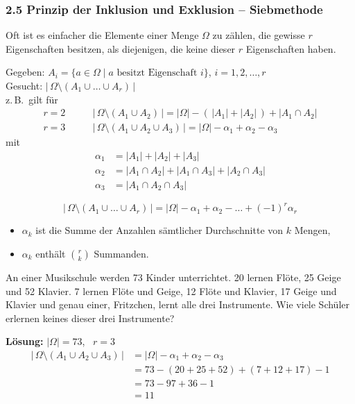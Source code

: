 \subsubsection*{2.5 Prinzip der Inklusion und Exklusion -- Siebmethode}


Oft ist es einfacher die Elemente einer Menge $\Omega$ zu zählen, die gewisse $r$ Eigenschaften besitzen, als diejenigen, die keine dieser $r$ Eigenschaften haben.

Gegeben: \quad $A_i = \{ a \in \Omega \mid a \text{ besitzt Eigenschaft } i \}$, \quad $i = 1, 2, \dots, r$\\
Gesucht: \quad $|\,\Omega \setminus (A_1 \cup \dots \cup A_r)\,|$\\
z.\,B.\ gilt für
\begin{align*}
r = 2 &\qquad |\,\Omega \setminus (A_1 \cup A_2)\,| = |\Omega| - (\,|A_1| + |A_2|\,) + |A_1 \cap A_2| \\
r = 3 &\qquad |\,\Omega \setminus (A_1 \cup A_2 \cup A_3)\,| = |\Omega| - \alpha_1 + \alpha_2 - \alpha_3
\end{align*}
mit
\begin{align*}
\alpha_1 &= |A_1| + |A_2| + |A_3| \\
\alpha_2 &= |A_1 \cap A_2| + |A_1 \cap A_3| + |A_2 \cap A_3| \\
\alpha_3 &= |A_1 \cap A_2 \cap A_3|
\end{align*}

\begin{satz}[Allgemein]
\[
|\,\Omega \setminus (A_1 \cup \dots \cup A_r)\,| = |\Omega| - \alpha_1 + \alpha_2 - \dots + (-1)^r \alpha_r
\]
\begin{itemize}
\item[-] $\alpha_k$ ist die Summe der Anzahlen sämtlicher Durchschnitte von $k$ Mengen,
\item[-] $\alpha_k$ enthält $\binom{r}{k}$ Summanden.
\end{itemize}
\end{satz}

\begin{beispiel}
An einer Musikschule werden 73 Kinder unterrichtet.
20 lernen Flöte, 25 Geige und 52 Klavier.
7 lernen Flöte und Geige, 12 Flöte und Klavier, 17 Geige und Klavier
und genau einer, Fritzchen, lernt alle drei Instrumente.
Wie viele Schüler erlernen keines dieser drei Instrumente?

\textbf{Lösung:} \quad $|\Omega| = 73$, \ $r = 3$
\begin{align*}
|\,\Omega \setminus (A_1 \cup A_2 \cup A_3)\,| &= |\Omega| - \alpha_1 + \alpha_2 - \alpha_3 \\
&= 73 - (20 + 25 + 52) + (7 + 12 + 17) - 1 \\
&= 73 - 97 + 36 - 1 \\
&= 11
\end{align*}
\end{beispiel}

